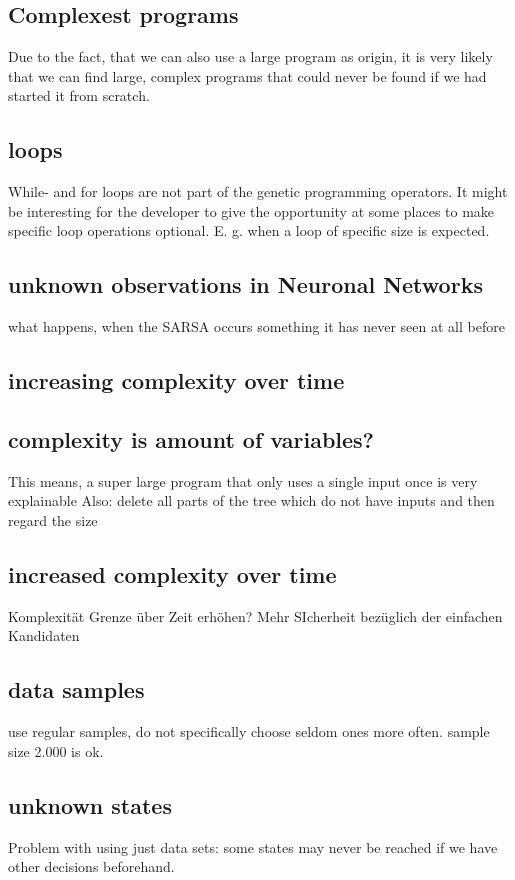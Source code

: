 \subsection{Complexest programs}

Due to the fact, that we  can also use a large program as origin, it is very likely that we can find large, complex programs that could never be found if we had started it from scratch.

\subsection{loops}
While- and for loops are not part of the genetic programming operators. It might be interesting for the developer to give the opportunity at some places to make specific loop operations optional. E. g. when a loop of specific size is expected.

\subsection{unknown observations in Neuronal Networks}
what happens, when the SARSA occurs something it has never seen at all before

\subsection{increasing complexity over time}


\subsection{complexity is amount of variables?}
This means, a super large program that only uses a single input once is very explainable
Also:
delete all parts of the tree which do not have inputs and then regard the size

\subsection{increased complexity over time}
Komplexität Grenze über Zeit erhöhen? Mehr SIcherheit bezüglich der einfachen Kandidaten

\subsection{data samples}
use regular samples, do not specifically choose seldom ones more often. sample size 2.000 is ok.

\subsection{unknown states}
Problem with using just data sets: some states may never be reached if we have other decisions beforehand.

